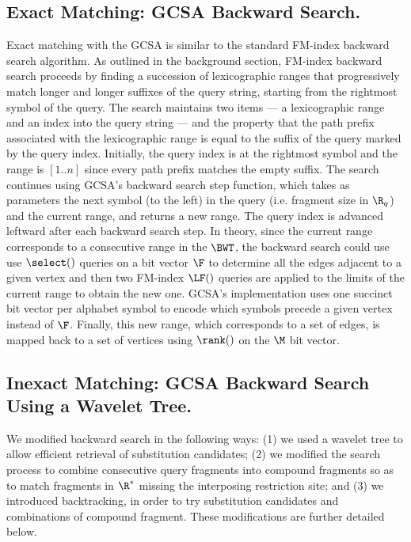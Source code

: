 \documentclass[doctor]{thesis}
\begin{document}
 







 


\subsection{Exact Matching: GCSA Backward Search.}


Exact matching with the GCSA is similar to the standard FM-index backward search algorithm. As outlined in the background section, FM-index backward search proceeds by finding a succession of lexicographic ranges that progressively match longer and longer suffixes of the query string, starting from the rightmost symbol of the query. The search maintains two items --- a lexicographic range and an index into the query string --- and the property that the path prefix associated with the lexicographic range is equal to the suffix of the query marked by the query index. Initially, the query index is at the rightmost symbol and the range is $[1..n]$ since every path prefix matches the empty suffix.  The search continues using GCSA's backward search step function, which takes as parameters the next symbol (to the left) in the query (i.e. fragment size in $\R_q$) and the current range, and returns a new range.  The query index is advanced leftward after each backward search step.  In theory, since the current range corresponds to a consecutive range in the $\BWT$, the backward search could use use $\select()$ queries on a bit vector $\F$ to determine all the edges adjacent to a given vertex and then two FM-index $\LF()$ queries are applied to the limits of the current range to obtain the new one.  GCSA's implementation uses one succinct bit vector per alphabet symbol to encode which symbols precede a given vertex instead of $\F$.  Finally, this new range, which corresponds to a set of edges, is mapped back to a set of vertices using $\rank()$ on the $\M$ bit vector.







\subsection{Inexact Matching: GCSA Backward Search Using a Wavelet Tree.}




We modified backward search in the following ways:
(1) we used a wavelet tree to allow efficient retrieval of substitution candidates; (2) we modified the search process to combine consecutive query fragments into compound fragments so as to match fragments in $\R^*$ missing the interposing restriction site; and (3) we introduced backtracking, in order to try substitution candidates and combinations of compound fragment. These modifications are further detailed below.
\end{document}
